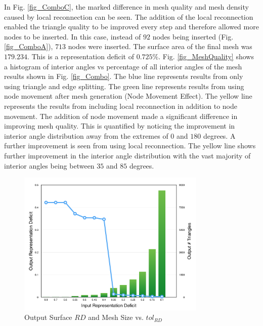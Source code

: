 In Fig. \ref{fig_ComboC}, the marked difference in mesh quality and mesh
density caused by local reconnection can be seen. The addition of the
local reconnection enabled the triangle quality to be improved every
step and therefore allowed more nodes to be inserted. In this case,
instead of $92$ nodes being inserted (Fig. \ref{fig_ComboA}), $713$
nodes were inserted. The surface area of the final mesh was $179.234$.
This is a representation deficit of $0.725\%$.  Fig.
\ref{fig_MeshQuality} shows a histogram of interior angles vs percentage
of all interior angles of the mesh results shown in Fig.
\ref{fig_Combo}. The blue line represents results from only using
triangle and edge splitting. The green line represents results from
using node movement after mesh generation (Node Movement Effect). The
yellow line represents the results from including local reconnection in
addition to node movement. The addition of node movement made a
significant difference in improving mesh quality. This is quantified
by noticing the improvement in interior angle distribution away from the
extremes of $0$ and $180$ degrees. A further improvement is seen from
using local reconnection. The yellow line shows further improvement in
the interior angle distribution with the vast majority of interior
angles being between $35$ and $85$ degrees.

\begin{figure}[h!]
  \begin{center}
  \includegraphics[width=90mm]{Figures/RDvsMeshSize.png}
  \caption{Output Surface $RD$ and Mesh Size vs. $tol_{RD}$}
  \label{fig_RDvsMeshSize}
  \end{center}
\end{figure}

